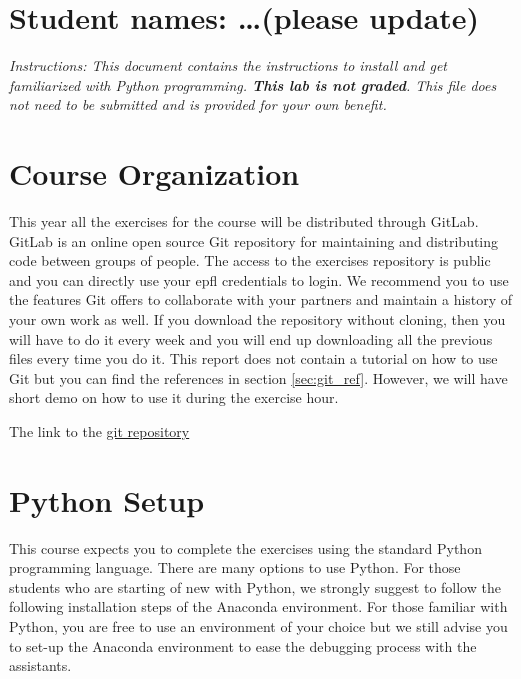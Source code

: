 \documentclass{cmc}
\begin{document}
\pagestyle{fancy}
 

\section*{Student names: \ldots (please update)}

\textit{Instructions: This document contains the instructions to install and get
  familiarized with Python programming.  \textbf{This lab is not graded}. This
  file does not need to be submitted and is provided for your own benefit.}



\section{Course Organization}

This year all the exercises for the course will be distributed through GitLab.
GitLab is an online open source Git repository for maintaining and distributing
code between groups of people. The access to the exercises repository is public
and you can directly use your epfl credentials to login.  We
recommend you to use the features Git offers to collaborate with your partners and
maintain a history of your own work as well.  If you download the repository
without cloning,  then you will have to do it every week and you will end up
downloading all the previous files every time you do it. This report does not
contain a tutorial on how to use Git but you can find the references in section
\ref{sec:git_ref}. However, we will have short demo on how to use it during the
exercise hour.

The link to the \href{https://gitlab.epfl.ch/BioRobCMC/2018}{git repository}

\section{Python Setup}

This course expects you to complete the exercises using the standard Python
programming language.  There are many options to use Python. For those students
who are starting of new with Python, we strongly suggest to follow the following
installation steps of the Anaconda environment. For those familiar with Python,
you are free to use an environment of your choice but we still advise you to
set-up the Anaconda environment to ease the debugging process with the
assistants.
\end{document}
